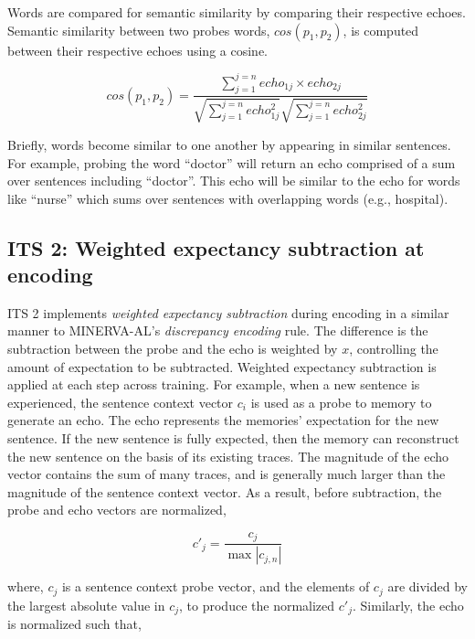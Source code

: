 \documentclass[10pt,letterpaper]{article}
\begin{document}
Words are compared for semantic similarity by comparing their respective echoes. Semantic similarity between two probes words, $cos(p_1,p_2)$, is computed between their respective echoes using a cosine.

\begin{equation}
cos(p_1,p_2) = \frac{\sum_{j=1}^{j=n}echo_{1j} \times{} echo_{2j}}{\sqrt{\sum_{j=1}^{j=n}echo_{1j}^2}\sqrt{\sum_{j=1}^{j=n}echo_{2j}^2}}
\label{eq:semanticsim}
\end{equation}

Briefly, words become similar to one another by appearing in similar sentences. For example, probing the word ``doctor'' will return an echo comprised of a sum over sentences including ``doctor''. This echo will be similar to the echo for words like ``nurse'' which sums over sentences with overlapping words (e.g., hospital).

\subsection{ITS 2: Weighted expectancy subtraction at encoding}

ITS 2 implements \emph{weighted expectancy subtraction} during encoding in a similar manner to MINERVA-AL's \emph{discrepancy encoding} rule. The difference is the subtraction between the probe and the echo is weighted by \(x\), controlling the amount of expectation to be subtracted. Weighted expectancy subtraction is applied at each step across training. For example, when a new sentence is experienced, the sentence context vector \(c_i\) is used as a probe to memory to generate an echo. The echo represents the memories' expectation for the new sentence. If the new sentence is fully expected, then the memory can reconstruct the new sentence on the basis of its existing traces. The magnitude of the echo vector contains the sum of many traces, and is generally much larger than the magnitude of the sentence context vector. As a result, before subtraction, the probe and echo vectors are normalized,

\begin{equation}
c'_j = \frac{c_j}{\max | c_{j,n} |}
\label{eq:normprobe}
\end{equation}

\noindent where, \(c_j\) is a sentence context probe vector, and the elements of \(c_j\) are divided by the largest absolute value in \(c_j\), to produce the normalized \(c'_j\). Similarly, the echo is normalized such that,
\end{document}
